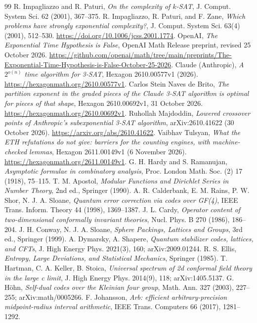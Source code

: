 \documentclass[10pt,a4paper]{article}
\numberwithin{equation}{section}
\theoremstyle{remark}\newtheorem{remark}[theorem]{Remark}\newtheorem{question}[theorem]{Question}
\begin{document}
\begin{thebibliography}{99}\footnotesize\setlength{\itemsep}{0pt}\setlength{\parskip}{0pt}
 R. Impagliazzo and R. Paturi, \emph{On the complexity of $k$-SAT}, J. Comput. System Sci. 62 (2001), 367--375.
 R. Impagliazzo, R. Paturi, and F. Zane,
\emph{Which problems have strongly exponential complexity?},
J. Comput. System Sci. 63(4) (2001), 512--530.
\url{https://doi.org/10.1006/jcss.2001.1774}.
 OpenAI, \emph{The Exponential Time Hypothesis is False},
OpenAI Math Release preprint, revised 25 October 2026.
\url{https://github.com/openai/math/tree/main/preprints/The-Exponential-Time-Hypothesis-is-False-October-25-2026}.
 Claude (Anthropic), \emph{A $2^{o(n)}$ time algorithm for 3-SAT}, Hexagon 2610.00577v1 (2026). \url{https://hexagonmath.org/2610.00577v1}.
 Carlos Stein Naves de Brito, \emph{The partition exponent in the graded pieces of the Claude 3-SAT algorithm is optimal for pieces of that shape}, Hexagon 2610.00692v1, 31 October 2026. \url{https://hexagonmath.org/2610.00692v1}.
 Ruhollah Majdoddin, \emph{Lowered crossover points of Anthropic's subexponential 3-SAT algorithm}, arXiv:2610.41622 (30 October 2026). \url{https://arxiv.org/abs/2610.41622}.
 Vaibhav Tulsyan, \emph{What the ETH refutations do not give: barriers for the counting engines, with machine-checked lemmas}, Hexagon 2611.00149v1 (6 November 2026). \url{https://hexagonmath.org/2611.00149v1}.
 G. H. Hardy and S. Ramanujan, \emph{Asymptotic formulae in combinatory analysis}, Proc. London Math. Soc. (2) 17 (1918), 75--115.
 T. M. Apostol, \emph{Modular Functions and Dirichlet Series in Number Theory}, 2nd ed., Springer (1990).
 A. R. Calderbank, E. M. Rains, P. W. Shor, N. J. A. Sloane, \emph{Quantum error correction via codes over GF(4)}, IEEE Trans. Inform. Theory 44 (1998), 1369--1387.
 J. L. Cardy, \emph{Operator content of two-dimensional conformally invariant theories}, Nucl. Phys. B 270 (1986), 186--204.
 J. H. Conway, N. J. A. Sloane, \emph{Sphere Packings, Lattices and Groups}, 3rd ed., Springer (1999).
 A. Dymarsky, A. Shapere, \emph{Quantum stabilizer codes, lattices, and CFTs}, J. High Energy Phys. 2021(3), 160; arXiv:2009.01244.
 R. S. Ellis, \emph{Entropy, Large Deviations, and Statistical Mechanics}, Springer (1985).
 T. Hartman, C. A. Keller, B. Stoica, \emph{Universal spectrum of 2d conformal field theory in the large c limit}, J. High Energy Phys. 2014(9), 118; arXiv:1405.5137.
 G. H\"ohn, \emph{Self-dual codes over the Kleinian four group}, Math. Ann. 327 (2003), 227--255; arXiv:math/0005266.
 F. Johansson, \emph{Arb: efficient arbitrary-precision midpoint-radius interval arithmetic}, IEEE Trans. Computers 66 (2017), 1281--1292.
\end{thebibliography}
\end{document}
